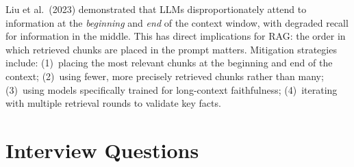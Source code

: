 \begin{keyinsight}
Liu et al.\ (2023) demonstrated that LLMs disproportionately attend to
information at the \emph{beginning} and \emph{end} of the context window,
with degraded recall for information in the middle.  This has direct
implications for RAG: the order in which retrieved chunks are placed in the
prompt matters.  Mitigation strategies include: (1)~placing the most relevant
chunks at the beginning and end of the context; (2)~using fewer, more
precisely retrieved chunks rather than many; (3)~using models specifically
trained for long-context faithfulness; (4)~iterating with multiple retrieval
rounds to validate key facts.
\end{keyinsight}


\section{Interview Questions}
\label{sec:rag-questions}

